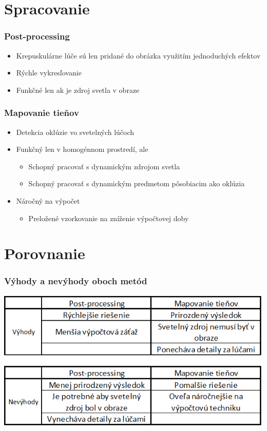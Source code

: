\documentclass{beamer}
\begin{document}
\section{Spracovanie}

\begin{frame}[fragile=singleslide]\frametitle{Post-processing}
\begin{itemize}
\item Krepuskulárne lúče sú len pridané do obrázka využitím jednoduchých efektov
\item Rýchle vykresľovanie
\item Funkčné len ak je zdroj svetla v obraze
\end{itemize}
\end{frame}

\begin{frame}[fragile=singleslide]\frametitle{Mapovanie tieňov}
\begin{itemize}
\item Detekcia oklúzie vo svetelných lúčoch
\item Funkčný len v homogénnom prostredí, ale
	\begin{itemize}
	\item Schopný pracovať s dynamickým zdrojom svetla
	\item Schopný pracovať s dynamickým predmetom pôsobiacim ako oklúzia
	\end{itemize}
\item Náročný na výpočet
\begin{itemize}
	\item Preložené vzorkovanie na zníženie výpočtovej doby
	\end{itemize}
\end{itemize}
\end{frame}

\section{Porovnanie}

\begin{frame}[fragile=singleslide]\frametitle{Výhody a nevýhody oboch metód}
\begin{center}
\includegraphics[scale=.65]{tabulla.png}
\end{center}
\end{frame}
\end{document}
